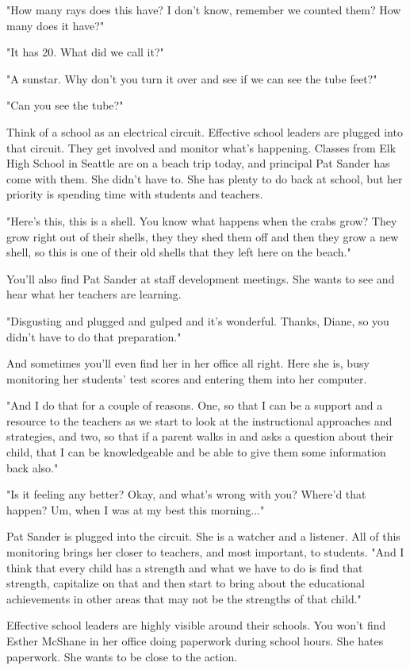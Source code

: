 "How many rays does this have?
I don't know, remember we counted them?
How many does it have?"

"It has 20.
What did we call it?"

"A sunstar.
Why don't you turn it over and see if we can see the tube feet?"

"Can you see the tube?"

Think of a school as an electrical circuit.
Effective school leaders are plugged into that circuit.
They get involved and monitor what's happening.
Classes from Elk High School in Seattle are on a beach trip today, and principal Pat Sander has come with them.
She didn't have to.
She has plenty to do back at school, but her priority is spending time with students and teachers.

"Here's this, this is a shell.
You know what happens when the crabs grow?
They grow right out of their shells, they they shed them off and then they grow a new shell, so this is one of their old shells that they left here on the beach."

You'll also find Pat Sander at staff development meetings.
She wants to see and hear what her teachers are learning.

"Disgusting and plugged and gulped and it's wonderful.
Thanks, Diane, so you didn't have to do that preparation."

And sometimes you'll even find her in her office all right.
Here she is, busy monitoring her students' test scores and entering them into her computer.

"And I do that for a couple of reasons.
One, so that I can be a support and a resource to the teachers as we start to look at the instructional approaches and strategies, and two, so that if a parent walks in and asks a question about their child, that I can be knowledgeable and be able to give them some information back also."

"Is it feeling any better?
Okay, and what's wrong with you?
Where'd that happen?
Um, when I was at my best this morning..."

Pat Sander is plugged into the circuit.
She is a watcher and a listener.
All of this monitoring brings her closer to teachers, and most important, to students.
"And I think that every child has a strength and what we have to do is find that strength, capitalize on that and then start to bring about the educational achievements in other areas that may not be the strengths of that child."

Effective school leaders are highly visible around their schools.
You won't find Esther McShane in her office doing paperwork during school hours.
She hates paperwork.
She wants to be close to the action.


